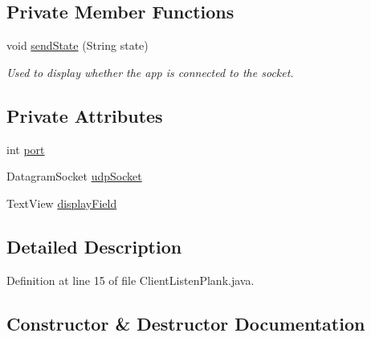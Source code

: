\subsection*{Private Member Functions}
\begin{DoxyCompactItemize}
\item 
void \mbox{\hyperlink{classcom_1_1example_1_1trainawearapplication_1_1_client_listen_plank_ab7af22341c89f6a1263612df9516d6e6}{send\+State}} (String state)
\begin{DoxyCompactList}\small\item\em Used to display whether the app is connected to the socket. \end{DoxyCompactList}\end{DoxyCompactItemize}
\subsection*{Private Attributes}
\begin{DoxyCompactItemize}
\item 
int \mbox{\hyperlink{classcom_1_1example_1_1trainawearapplication_1_1_client_listen_plank_aa394560dfa0da718f5ca639b82795395}{port}}
\item 
Datagram\+Socket \mbox{\hyperlink{classcom_1_1example_1_1trainawearapplication_1_1_client_listen_plank_a1834dc9b799cdf87ebf89fd34136ccfa}{udp\+Socket}}
\item 
Text\+View \mbox{\hyperlink{classcom_1_1example_1_1trainawearapplication_1_1_client_listen_plank_a2b606ab855a6ec1cabbb5f84a0eb1de0}{display\+Field}}
\end{DoxyCompactItemize}


\subsection{Detailed Description}


Definition at line 15 of file Client\+Listen\+Plank.\+java.



\subsection{Constructor \& Destructor Documentation}
\mbox{\label{classcom_1_1example_1_1trainawearapplication_1_1_client_listen_plank_af1cb478f41c794eaa377a1150009d070}} 
